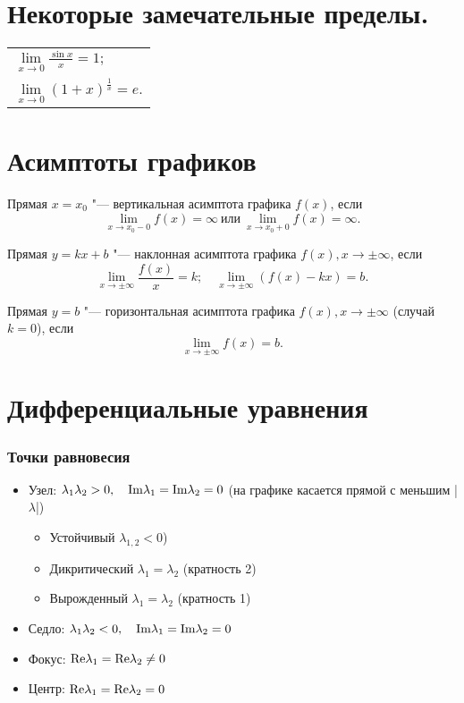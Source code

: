 \section{Некоторые замечательные пределы.}
\begin{longtable}[l]{l}
$\lim\limits_{x\to0}\frac{\sin x}{x}=1;$
\\
$\lim\limits_{x\to0} (1+x)^{\frac{1}{x}}=e.$
\end{longtable}

\section{Асимптоты графиков}
\textbullet \quad
Прямая $x=x_0$ "--- вертикальная асимптота графика $f(x)$, если $$\lim\limits_{x\to x_0-0}f(x)=\infty\ \text{или}\ \lim\limits_{x\to x_0+0}f(x)=\infty.$$ 

\textbullet \quad
Прямая $y=kx+b$ "--- наклонная асимптота графика $f(x), x\to\pm\infty$, если $$\lim\limits_{x\to\pm\infty}\frac{f(x)}{x}=k; \quad \lim\limits_{x\to\pm\infty} (f(x)-kx)=b.$$

\textbullet \quad
Прямая $y=b$ "--- горизонтальная асимптота графика $f(x), x\to\pm\infty$ (случай $k=0$), если $$ \lim\limits_{x\to\pm\infty} f(x)=b.$$


\section{Дифференциальные уравнения}
\subsubsection {Точки равновесия}

\begin{itemize}
	\item
	Узел: $\lambda _1 \lambda _2 > 0, \quad \rm{Im}\lambda _1 = \rm{Im}\lambda _2 = 0$ (на графике касается прямой с меньшим |$\lambda$|)
	
	\begin{itemize}
		\item Устойчивый $\lambda _{1,2} < 0$)
		
		\item Дикритический $\lambda _1 = \lambda _2$ (кратность 2)
		
		\item Вырожденный $\lambda _1 = \lambda _2$ (кратность 1)
	\end{itemize}
	
	\item
	Седло: $\lambda _1 \lambda _2 < 0, \quad \rm{Im}\lambda _1 = \rm{Im}\lambda _2 = 0$ 
	
	\item
	Фокус: $\rm{Re}\lambda _1 = \rm{Re}\lambda _2 \ne 0$ 
	
	\item
	Центр: $\rm{Re}\lambda _1 = \rm{Re}\lambda _2 = 0$ 
\end{itemize}

